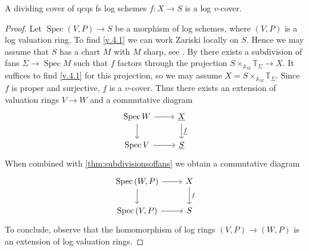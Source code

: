 \documentclass[10pt]{amsart}
\newcommand{\A}{\mathbb{A}}
\newcommand{\T}{\mathbb{T}}
\DeclareMathOperator{\Spec}{Spec}
\newcommand{\ul}{\underline}
\begin{document}
\begin{proposition}\label{prop:diviningcover is a logvcover}
A dividing cover of qcqs fs log schemes
$f \colon X \to S$ is a log $v$-cover.
\end{proposition}
\begin{proof}
Let $\Spec{(V,P)} \to S$ be a morphism of log schemes,
where $(V,P)$ is a log valuation ring.
To find \eqref{v.4.1}
we can work Zariski locally on $S$.
Hence we may assume that $S$ has a chart $M$ with $M$ sharp,
see \cite[Proposition II.2.3.7]{Ogu}.
By \cite[Proposition A.11.5]{logDM}
there exists a subdivision of fans $\Sigma\to \Spec{M}$ such that $f$ factors through the projection $S\times_{\A_M} \T_\Sigma\to X$.
It suffices to find \eqref{v.4.1} for this projection,
so we may assume $X=S\times_{\A_M} \T_\Sigma$.
Since $f$ is proper and surjective,
$\ul{f}$ is a $v$-cover.
Thus there exists an extension of valuation rings $V\to W$ and a commutative diagram
\[
\begin{tikzcd}
\Spec{W}\ar[d]\ar[r]&\ul{X}\ar[d,"\ul{f}"]
\\
\Spec{V}\ar[r]&
\ul{S}
\end{tikzcd}
\]
When combined with \cref{thm:subdivisionsoffans}
we obtain a commutative diagram
\[
\begin{tikzcd}
\Spec{(W,P)}\ar[d]\ar[r]&X\ar[d,"f"]
\\
\Spec{(V,P)}\ar[r]&
S
\end{tikzcd}
\]
To conclude, 
observe that the homomorphism of log rings $(V,P)\to (W,P)$ is an extension of log valuation rings.
\end{proof}
\end{document}
